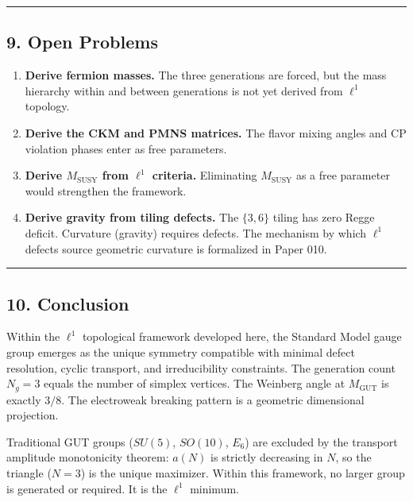 \documentclass[
]{article}
\begin{document}
\begin{center}\rule{0.5\linewidth}{0.5pt}\end{center}

\hypertarget{open-problems}{%
\subsection{9. Open Problems}\label{open-problems}}

\begin{enumerate}
\def\labelenumi{\arabic{enumi}.}
\item
  \textbf{Derive fermion masses.} The three generations are forced, but
  the mass hierarchy within and between generations is not yet derived
  from \(\ell^1\) topology.
\item
  \textbf{Derive the CKM and PMNS matrices.} The flavor mixing angles
  and CP violation phases enter as free parameters.
\item
  \textbf{Derive \(M_{\mathrm{SUSY}}\) from \(\ell^1\) criteria.}
  Eliminating \(M_{\mathrm{SUSY}}\) as a free parameter would strengthen
  the framework.
\item
  \textbf{Derive gravity from tiling defects.} The \(\{3,6\}\) tiling
  has zero Regge deficit. Curvature (gravity) requires defects. The
  mechanism by which \(\ell^1\) defects source geometric curvature is
  formalized in Paper 010.
\end{enumerate}

\begin{center}\rule{0.5\linewidth}{0.5pt}\end{center}

\hypertarget{conclusion}{%
\subsection{10. Conclusion}\label{conclusion}}

Within the \(\ell^1\) topological framework developed here, the Standard
Model gauge group emerges as the unique symmetry compatible with minimal
defect resolution, cyclic transport, and irreducibility constraints. The
generation count \(N_g = 3\) equals the number of simplex vertices. The
Weinberg angle at \(M_{\mathrm{GUT}}\) is exactly \(3/8\). The
electroweak breaking pattern is a geometric dimensional projection.

Traditional GUT groups (\(SU(5)\), \(SO(10)\), \(E_6\)) are excluded by
the transport amplitude monotonicity theorem: \(a(N)\) is strictly
decreasing in \(N\), so the triangle (\(N = 3\)) is the unique
maximizer. Within this framework, no larger group is generated or
required. It is the \(\ell^1\) minimum.
\end{document}
